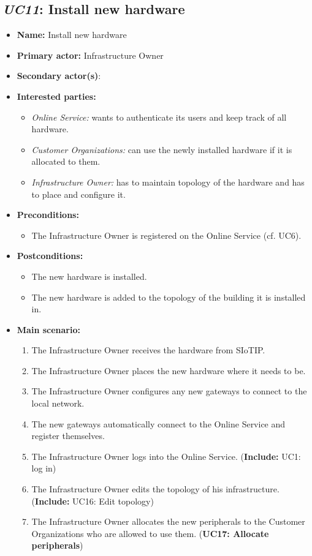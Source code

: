 \documentclass[english,peerreview]{sareport}
\begin{document}
\subsection{\emph{UC11}: Install new hardware}
\begin{itemize}
    \item \textbf{Name:} Install new hardware
    \item \textbf{Primary actor:} Infrastructure Owner
    \item \textbf{Secondary actor(s)}: 
    \item \textbf{Interested parties:} 
        \begin{itemize}
            \item \textit{Online Service:}  wants to authenticate its users and keep track of all hardware.
            \item \textit{Customer Organizations:} can use the newly installed hardware if it is allocated to them.
            \item \textit{Infrastructure Owner:} has to maintain topology of the hardware and has to place and configure it.
        \end{itemize}

    \item \textbf{Preconditions:}
        \begin{itemize}
            \item The Infrastructure Owner is registered on the Online Service (cf. UC6).
        \end{itemize}

    \item \textbf{Postconditions:}
        \begin{itemize}
            \item The new hardware is installed.
            \item The new hardware is added to the topology of the building it is installed in.
        \end{itemize}
        
    \item \textbf{Main scenario:} 
    \begin{enumerate}
       \item The Infrastructure Owner receives the hardware from SIoTIP.
       \item The Infrastructure Owner places the new hardware where it needs to be.
       \item The Infrastructure Owner configures any new gateways to connect to the local network.
       \item The new gateways automatically connect to the Online Service and register themselves.
       \item The Infrastructure Owner logs into the Online Service. (\textbf{Include:} UC1: log in)
       \item The Infrastructure Owner edits the topology of his infrastructure. (\textbf{Include:} UC16: Edit topology)
       \item The Infrastructure Owner allocates the new peripherals to the Customer Organizations who are allowed to use them. (\textbf{UC17: Allocate peripherals})
    \end{enumerate}
\end{itemize}
\end{document}
